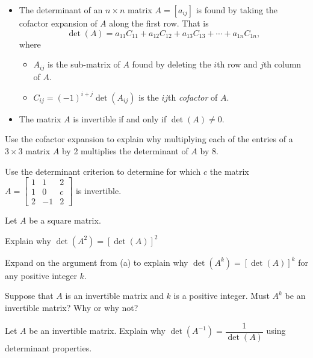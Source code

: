 \begin{itemize}
\item The determinant of an $n \times n$ matrix $A = [a_{ij}]$ is found by taking the cofactor expansion of $A$ along the first row. That is
\[\det(A) = a_{11}C_{11} + a_{12}C_{12} + a_{13}C_{13} + \cdots + a_{1n}C_{1n},\]
where
    \begin{itemize}
    \item $A_{ij}$ is the sub-matrix of $A$ found by deleting the $i$th row and $j$th column of $A$.
    \item $C_{ij} = (-1)^{i+j} \det\left(A_{ij}\right)$ is the $ij$th \emph{cofactor} of $A$.
    \end{itemize}
\item The matrix $A$ is invertible if and only if $\det(A) \neq 0$.


\end{itemize}



\label{sec:det_exer}

\be
\item Use the cofactor expansion to explain why multiplying each of the entries of a $3\times 3$ matrix $A$ by 2 multiplies the determinant of $A$ by 8.

\item Use the determinant criterion to determine for which $c$ the matrix $A=\left[ \begin{array}{crc} 1& 1& 2\\ 1& 0&c\\ 2&-1&2 \end{array} \right]$ is invertible.

\item Let $A$ be a square matrix.
	\ba
	\item Explain why $\det(A^2) = [\det(A)]^2$	
	\item Expand on the argument from (a) to explain why $\det(A^k) = [\det(A)]^k$ for any positive integer $k$.
	\item Suppose that $A$ is an invertible matrix and $k$ is a positive integer. Must $A^k$ be an invertible matrix? Why or why not? 
	
	\ea

	
\item Let $A$ be an invertible matrix. Explain why $\det(A^{-1})= \dfrac{1}{\det(A)}$ using determinant properties.

